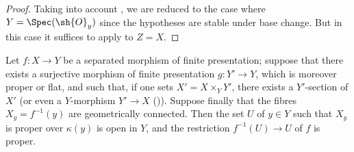 \begin{proof}
Taking into account , we are reduced to the case where $Y=\Spec(\sh{O}_y)$ since the hypotheses are stable under base change.
But in this case it suffices to apply  to $Z=X$.
\end{proof}

\begin{corollary}[15.7.11]
\label{IV.15.7.11}
Let $f:X\to Y$ be a separated morphism of finite presentation; suppose that there exists a surjective morphism of finite presentation $g:Y'\to Y$, which is moreover proper or flat, and such that, if one sets $X'=X\times_Y Y'$, there exists a $Y'$-section of $X'$ (or even a $Y$-morphism $Y'\to X$ ()).
Suppose finally that the fibres $X_y=f^{-1}(y)$ are geometrically connected.
Then the set $U$ of $y\in Y$ such that $X_y$ is proper over $\kappa(y)$ is open in $Y$, and the restriction $f^{-1}(U)\to U$ of $f$ is proper.
\end{corollary}

